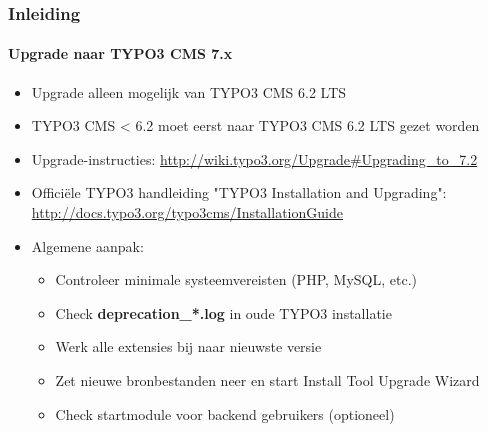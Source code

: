 \begin{frame}[fragile]
	\frametitle{Inleiding}
	\framesubtitle{Upgrade naar TYPO3 CMS 7.x}

	\begin{itemize}
		\item Upgrade alleen mogelijk van TYPO3 CMS 6.2 LTS
		\item TYPO3 CMS < 6.2 moet eerst naar TYPO3 CMS 6.2 LTS gezet worden
	\end{itemize}

	\begin{itemize}

		\item Upgrade-instructies:\newline
			\smaller\url{http://wiki.typo3.org/Upgrade#Upgrading_to_7.2}\normalsize
		\item Officiële TYPO3 handleiding "TYPO3 Installation and Upgrading":
			\smaller\url{http://docs.typo3.org/typo3cms/InstallationGuide}\normalsize
		\item Algemene aanpak:
			\begin{itemize}
				\item Controleer minimale systeemvereisten (PHP, MySQL, etc.)
				\item Check \textbf{deprecation\_*.log} in oude TYPO3 installatie
				\item Werk alle extensies bij naar nieuwste versie
				\item Zet nieuwe bronbestanden neer en start Install Tool \textrightarrow Upgrade Wizard
				\item Check startmodule voor backend gebruikers (optioneel)
			\end{itemize}
	\end{itemize}

\end{frame}

